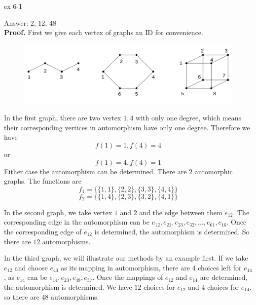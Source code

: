
\begin{exercise}
ex 6-1
\end{exercise}


Answer: 2, 12, 48\\
\textbf{Proof.} First we give each vertex of graphs an ID for convenience.
\begin{figure}[hpbt]
\begin{center}
\includegraphics[width=0.8 \textwidth]{ex6-1_img.png}
\end{center}
\end{figure}

In the first graph, there are two vertex $1,4$ with only one degree, which means their corresponding vertices in automorphism have only one degree. Therefore we have 
$$f(1)=1, f(4)=4$$ 
or 
$$f(1)=4, f(4)=1$$
Either case the automorphism can be determined. There are $2$ automorphic graphs. The functions are
$$f_1=\{\{1,1\}, \{2,2\}, \{3,3\}, \{4,4\}\}$$ 
$$f_2=\{\{1,4\}, \{2,3\}, \{3,2\}, \{4,1\}\}$$
\par In the second graph, we take vertex $1$ and $2$ and the edge between them $e_{12}$. The corresponding edge in the automorphism can be $e_{12},e_{21}, e_{23}, e_{32},..., e_{61},e_{16}$. Once the corresponding edge of $e_{12}$ is determined, the automorphism is determined. So there are  $12$ automorphisms.

\par In the third graph, we will illustrate our methods by an example first. If we take $e_{12}$ and choose $e_{43}$ as its mapping in automorphism, there are $4$ choices left for $e_{14}$, as $e_{14}$ can be $e_{14}, e_{23}, e_{48}, e_{37}$. Once the mappings of $e_{12}$ and $e_{14}$ are determined, the automorphism is determined. We have $12$ choices for $e_{12}$ and $4$ choices for $e_{14}$, so there are $48$ automorphisms.